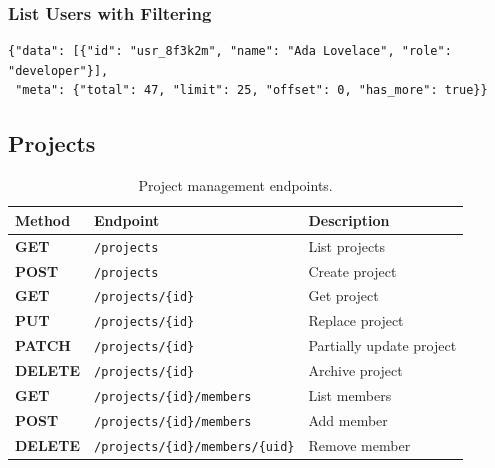 \documentclass[
    language=english,
    doctype=article,
    institution=none,
]{../../omnilatex}
\newcommand{\methodget}{\textcolor{green!50!black}{\textbf{GET}}}
\newcommand{\methodpost}{\textcolor{blue!70!black}{\textbf{POST}}}
\newcommand{\methodput}{\textcolor{orange!80!black}{\textbf{PUT}}}
\newcommand{\methodpatch}{\textcolor{purple!70!black}{\textbf{PATCH}}}
\newcommand{\methoddelete}{\textcolor{red!70!black}{\textbf{DELETE}}}
\begin{document}
\subsubsection{List Users with Filtering}
\begin{reqbox}[--- \texttt{GET /v2/users?role=developer\&limit=25}]
\end{reqbox}
\begin{resbox}[200 OK]
\begin{verbatim}
{"data": [{"id": "usr_8f3k2m", "name": "Ada Lovelace", "role": "developer"}],
 "meta": {"total": 47, "limit": 25, "offset": 0, "has_more": true}}
\end{verbatim}
\end{resbox}

\subsection{Projects}
\label{sec:projects}
\begin{table}[htbp]
    \centering
    \caption{Project management endpoints.}
    \label{tab:projects-ep}
    \begin{tabular}{@{}llp{5cm}@{}}
        \toprule
        \textbf{Method} & \textbf{Endpoint} & \textbf{Description} \\
        \midrule
        \methodget    & \texttt{/projects}                        & List projects \\
        \methodpost   & \texttt{/projects}                        & Create project \\
        \methodget    & \texttt{/projects/\{id\}}                 & Get project \\
        \methodput    & \texttt{/projects/\{id\}}                 & Replace project \\
        \methodpatch  & \texttt{/projects/\{id\}}                 & Partially update project \\
        \methoddelete & \texttt{/projects/\{id\}}                 & Archive project \\
        \methodget    & \texttt{/projects/\{id\}/members}         & List members \\
        \methodpost   & \texttt{/projects/\{id\}/members}         & Add member \\
        \methoddelete & \texttt{/projects/\{id\}/members/\{uid\}} & Remove member \\
        \bottomrule
    \end{tabular}
\end{table}
\end{document}
